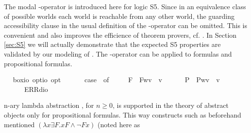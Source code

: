 \begin{isabellebody}
\begin{isamarkuptext}%
The modal \isa{\isactrlbold {\isasymbox}}-operator is introduced here for logic S5. Since in an equivalence class
  of possible worlds each world is reachable from any other world, the guarding accessibility clause
  in the usual definition of the \isa{\isactrlbold {\isasymbox}}-operator can be omitted. This is convenient and also
  improves the efficience of theorem provers, cf. \cite{C55}.  
  In Section \ref{sec:S5} we will actually demonstrate that the expected S5 properties
  are validated by our modeling of \isa{\isactrlbold {\isasymbox}}.  The \isa{\isactrlbold {\isasymbox}}-operator can be applied to 
  formulas  and propositional formulas.%
\end{isamarkuptext}\isamarkuptrue%
\ \isamarkupfalse%
\ box{\isacharcolon}{\isacharcolon}{\isachardoublequoteopen}io\ opt{\isasymRightarrow}io\ opt{\isachardoublequoteclose}\ {\isacharparenleft}{\isachardoublequoteopen}\isactrlbold {\isasymbox}{\isacharunderscore}{\isachardoublequoteclose}\ {\isacharbrackleft}{}{}{\isacharbrackright}\ {}{}{\isacharparenright}\ \ {\isachardoublequoteopen}\isactrlbold {\isasymbox}{\isasymphi}\ {\isasymequiv}\ case\ {\isasymphi}\ of\ \isanewline
\ \ \ \ F{\isacharparenleft}{\isasympsi}{\isacharparenright}\ {\isasymRightarrow}\ F{\isacharparenleft}{\isasymlambda}w{\isachardot}{\isasymforall}v{\isachardot}\ {\isasympsi}\ v{\isacharparenright}\ {\isacharbar}\ \isanewline
\ \ \ \ P{\isacharparenleft}{\isasympsi}{\isacharparenright}\ {\isasymRightarrow}\ P{\isacharparenleft}{\isasymlambda}w{\isachardot}{\isasymforall}v{\isachardot}\ {\isasympsi}\ v{\isacharparenright}\ {\isacharbar}\ \isanewline
\ \ \ \ {\isacharunderscore}\ {\isasymRightarrow}\ ERR{\isacharparenleft}dio{\isacharparenright}{\isachardoublequoteclose}%
\begin{isamarkuptext}%
n-ary lambda abstraction , for $n\geq 0$, is supported in the theory of abstract 
  objects only for propositional formulas. This way constructs such as 
  beforehand mentioned $(\lambda x \exists F. xF \wedge \neg Fx)$  (noted here as  

\end{isamarkuptext}
\end{isabellebody}
